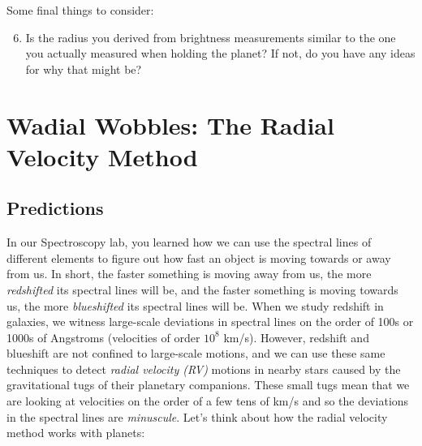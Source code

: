 \documentclass[11pt]{article}
\begin{document}
\medskip \noindent
Some final things to consider:
\begin{enumerate}
\setcounter{enumi}{5}
    \item Is the radius you derived from brightness measurements similar to the one you actually measured when holding the planet? If not, do you have any ideas for why that might be?
    
\end{enumerate}


\section{Wadial Wobbles: The Radial Velocity Method}
\subsection{Predictions} \label{sec:RV_predictions}

In our Spectroscopy lab, you learned how we can use the spectral lines of different elements to figure out how fast an object is moving towards or away from us.  In short, the faster something is moving away from us, the more \textit{redshifted} its spectral lines will be, and the faster something is moving towards us, the more \textit{blueshifted} its spectral lines will be.  When we study redshift in galaxies, we witness large-scale deviations in spectral lines on the order of 100s or 1000s of Angstroms (velocities of order $10^8$ km/s).  However, redshift and blueshift are not confined to large-scale motions, and we can use these same techniques to detect \textit{radial velocity (RV)} motions in nearby stars caused by the gravitational tugs of their planetary companions.  These small tugs mean that we are looking at velocities on the order of a few tens of km/s and so the deviations in the spectral lines are \textit{minuscule}. Let's think about how the radial velocity method works with planets:
\end{document}
